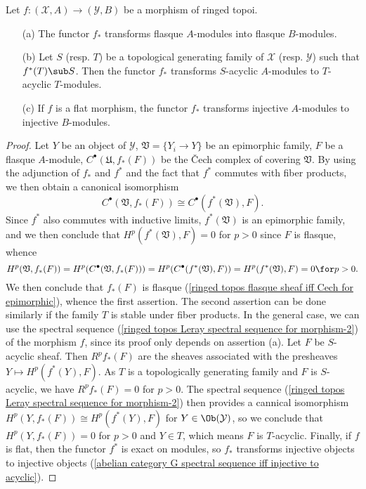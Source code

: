 \begin{proposition}\label{ringed topos morphism on acyclic sheaf}
Let $f:(\mathcal{X},A)\to (\mathcal{Y},B)$ be a morphism of ringed topoi.
\begin{enumerate}
    \item[(a)] The functor $f_*$ transforms flasque $A$-modules into flasque $B$-modules.
    \item[(b)] Let $S$ (resp. $T$) be a topological generating family of $\mathcal{X}$ (resp. $\mathcal{Y}$) such that $f^*(T)\sub S$. Then the functor $f_*$ transforms $S$-acyclic $A$-modules to $T$-acyclic $T$-modules.
    \item[(c)] If $f$ is a flat morphism, the functor $f_*$ transforms injective $A$-modules to injective $B$-modules.
\end{enumerate}
\end{proposition}
\begin{proof}
Let $Y$ be an object of $\mathcal{Y}$, $\mathfrak{V}=\{Y_i\to Y\}$ be an epimorphic family, $F$ be a flasque $A$-module, $C^\bullet(\mathfrak{U},f_*(F))$ be the \v{C}ech complex of covering $\mathfrak{V}$. By using the adjunction of $f_*$ and $f^*$ and the fact that $f^*$ commutes with fiber products, we then obtain a canonical isomorphism
\[C^\bullet(\mathfrak{V},f_*(F))\cong C^\bullet(f^*(\mathfrak{V}),F).\]
Since $f^*$ also commutes with inductive limits, $f^*(\mathfrak{V})$ is an epimorphic family, and we then conclude that $H^p(f^*(\mathfrak{V}),F)=0$ for $p>0$ since $F$ is flasque, whence
\[H^p(\mathfrak{V},f_*(F))=H^p(C^\bullet(\mathfrak{V},f_*(F)))=H^p(C^\bullet(f^*(\mathfrak{V}),F))=H^p(f^*(\mathfrak{V}),F)=0\for p>0.\]
We then conclude that $f_*(F)$ is flasque (\cref{ringed topos flasque sheaf iff Cech for epimorphic}), whence the first assertion. The second assertion can be done similarly if the family $T$ is stable under fiber products. In the general case, we can use the spectral sequence (\ref{ringed topos Leray spectral sequence for morphism-2}) of the morphism $f$, since its proof only depends on assertion (a). Let $F$ be $S$-acyclic sheaf. Then $R^pf_*(F)$ are the sheaves associated with the presheaves $Y\mapsto H^p(f^*(Y),F)$. As $T$ is a topologically generating family and $F$ is $S$-acyclic, we have $R^pf_*(F)=0$ for $p>0$. The spectral sequence (\ref{ringed topos Leray spectral sequence for morphism-2}) then provides a cannical isomorphism $H^p(Y,f_*(F))\cong H^p(f^*(Y),F)$ for $Y\in\Ob(\mathcal{Y})$, so we conclude that $H^p(Y,f_*(F))=0$ for $p>0$ and $Y\in T$, which means $F$ is $T$-acyclic. Finally, if $f$ is flat, then the functor $f^*$ is exact on modules, so $f_*$ transforms injective objects to injective objects (\cref{abelian category G spectral sequence iff injective to acyclic}).
\end{proof}

